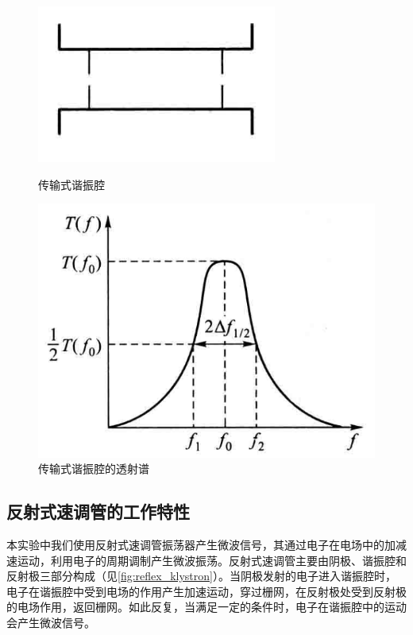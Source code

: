 \documentclass[font=default]{mpltx}
\begin{document}
\begin{figure}[h]
  \centering
  \begin{minipage}[t]{0.2\textwidth}
    \centering
    \vspace{-3cm}
    \includegraphics[width=\textwidth]{fig/transmission_reso.png}
    \caption{传输式谐振腔}
    \label{fig:transmission_reso} 
  \end{minipage}
  \hspace{1cm}
  \begin{minipage}[t]{0.35\textwidth}
    \centering
    \includegraphics[width=\textwidth]{fig/reso_curve.png}
    \caption{传输式谐振腔的透射谱}
    \label{fig:reso_curve}
  \end{minipage}
\end{figure}

\subsection{反射式速调管的工作特性}
本实验中我们使用反射式速调管振荡器产生微波信号，其通过电子在电场中的加减速运动，利用电子的周期调制产生微波振荡。反射式速调管主要由阴极、谐振腔和反射极三部分构成（见\autoref{fig:reflex_klystron}）。当阴极发射的电子进入谐振腔时，电子在谐振腔中受到电场的作用产生加速运动，穿过栅网，在反射极处受到反射极的电场作用，返回栅网。如此反复，当满足一定的条件时，电子在谐振腔中的运动会产生微波信号。
\end{document}
